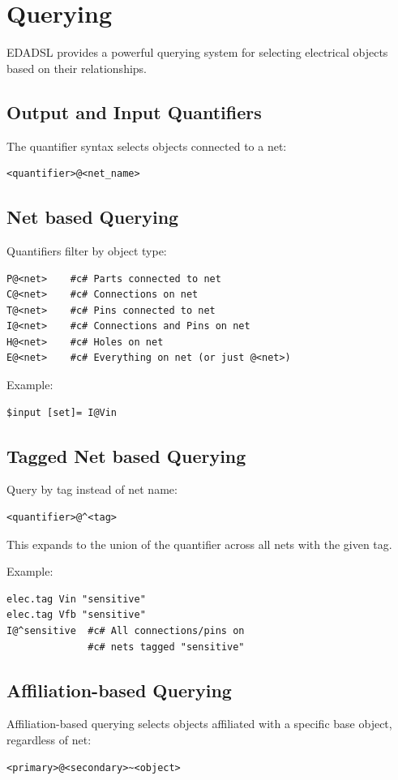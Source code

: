 \chapter{Querying}
EDADSL provides a powerful querying system for selecting electrical objects based on their relationships.

\section{Output and Input Quantifiers}
The quantifier syntax selects objects connected to a net:
\begin{verbatim}
<quantifier>@<net_name>
\end{verbatim}

\section{Net based Querying}
Quantifiers filter by object type:
\begin{verbatim}
P@<net>    #c# Parts connected to net
C@<net>    #c# Connections on net
T@<net>    #c# Pins connected to net
I@<net>    #c# Connections and Pins on net
H@<net>    #c# Holes on net
E@<net>    #c# Everything on net (or just @<net>)
\end{verbatim}

Example:
\begin{verbatim}
$input [set]= I@Vin
\end{verbatim}

\section{Tagged Net based Querying}
Query by tag instead of net name:
\begin{verbatim}
<quantifier>@^<tag>
\end{verbatim}
This expands to the union of the quantifier across all nets with the given tag.

Example:
\begin{verbatim}
elec.tag Vin "sensitive"
elec.tag Vfb "sensitive"
I@^sensitive  #c# All connections/pins on 
              #c# nets tagged "sensitive"
\end{verbatim}

\section{Affiliation-based Querying}
Affiliation-based querying selects objects affiliated with a specific base object, regardless of net:
\begin{verbatim}
<primary>@<secondary>~<object>
\end{verbatim}

